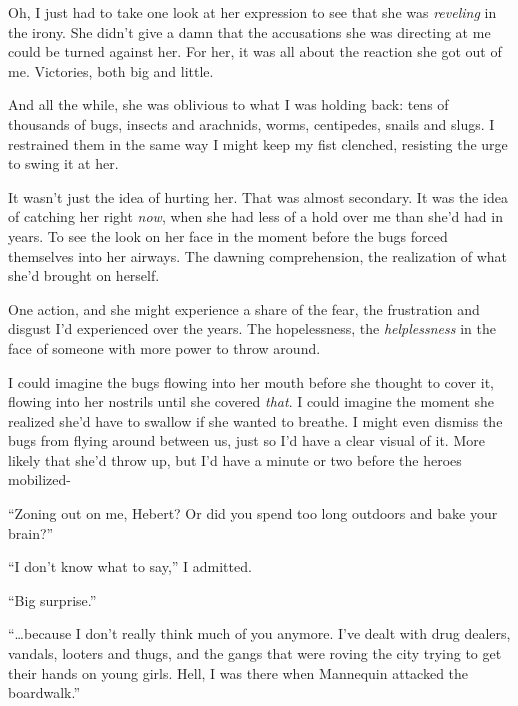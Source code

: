 Oh, I just had to take one look at her expression to see that she was \emph{reveling} in the irony.  She didn't give a damn that the accusations she was directing at me could be turned against her.  For her, it was all about the reaction she got out of me.  Victories, both big and little.



And all the while, she was oblivious to what I was holding back: tens of thousands of bugs, insects and arachnids, worms, centipedes, snails and slugs.  I restrained them in the same way I might keep my fist clenched, resisting the urge to swing it at her.



It wasn't just the idea of hurting her.  That was almost secondary.  It was the idea of catching her right \emph{now}, when she had less of a hold over me than she'd had in years.  To see the look on her face in the moment before the bugs forced themselves into her airways.  The dawning comprehension, the realization of what she'd brought on herself.



One action, and she might experience a share of the fear, the frustration and disgust I'd experienced over the years.  The hopelessness, the \emph{helplessness} in the face of someone with more power to throw around.



I could imagine the bugs flowing into her mouth before she thought to cover it, flowing into her nostrils until she covered \emph{that}.  I could imagine the moment she realized she'd have to swallow if she wanted to breathe.  I might even dismiss the bugs from flying around between us, just so I'd have a clear visual of it.  More likely that she'd throw up, but I'd have a minute or two before the heroes mobilized-



``Zoning out on me, Hebert?  Or did you spend too long outdoors and bake your brain?''



``I don't know what to say,'' I admitted.



``Big surprise.''



``\ldots{}because I don't really think much of you anymore.  I've dealt with drug dealers, vandals, looters and thugs, and the gangs that were roving the city trying to get their hands on young girls.  Hell, I was there when Mannequin attacked the boardwalk.''




